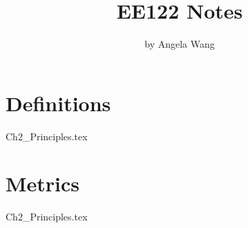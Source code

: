 \documentclass{book}
\title{EE122 Notes}
\author{by Angela Wang}
\begin{document}
\maketitle
\tableofcontents
\mainmatter

\chapter{Definitions}
{Ch2_Principles.tex}

\chapter{Metrics}
{Ch2_Principles.tex}
\end{document}
